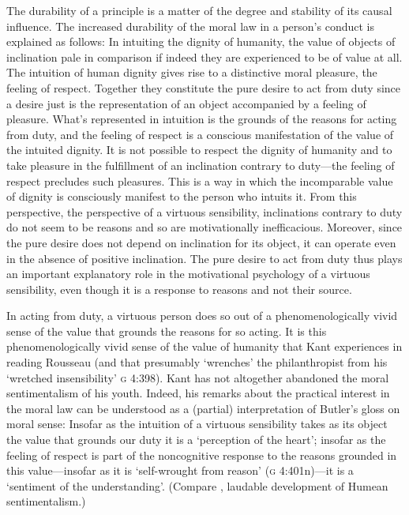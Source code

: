 \documentclass[12pt]{article}
\begin{document}
The durability of a principle is a matter of the degree and stability of its causal influence. The increased durability of the moral law in a person's conduct is explained as follows: In intuiting the dignity of humanity, the value of objects of inclination pale in comparison if indeed they are experienced to be of value at all. The intuition of human dignity gives rise to a distinctive moral pleasure, the feeling of respect. Together they constitute the pure desire to act from duty since a desire just is the representation of an object accompanied by a feeling of pleasure. What's represented in intuition is the grounds of the reasons for acting from duty, and the feeling of respect is a conscious manifestation of the value of the intuited dignity. It is not possible to respect the dignity of humanity and to take pleasure in the fulfillment of an inclination contrary to duty---the feeling of respect precludes such pleasures. This is a way in which the incomparable value of dignity is consciously manifest to the person who intuits it. From this perspective, the perspective of a virtuous sensibility, inclinations contrary to duty do not seem to be reasons and so are motivationally inefficacious. Moreover, since the pure desire does not depend on inclination for its object, it can operate even in the absence of positive inclination. The pure desire to act from duty thus plays an important explanatory role in the motivational psychology of a virtuous sensibility, even though it is a response to reasons and not their source.

In acting from duty, a virtuous person does so out of a phenomenologically vivid sense of the value that grounds the reasons for so acting. It is this phenomenologically vivid sense of the value of humanity that Kant experiences in reading Rousseau (and that presumably `wrenches' the philanthropist from his `wretched insensibility' \textsc{g} 4:398). Kant has not altogether abandoned the moral sentimentalism of his youth. Indeed, his remarks about the practical interest in the moral law can be understood as a (partial) interpretation of Butler's \citeyearpar{Butler:1736id} gloss on moral sense: Insofar as the intuition of a virtuous sensibility takes as its object the value that grounds our duty it is a `perception of the heart'; insofar as the feeling of respect is part of the noncognitive response to the reasons grounded in this value---insofar as it is `self-wrought from reason' (\textsc{g} 4:401n)---it is a `sentiment of the understanding'. (Compare \citealp{Wiggins:1987ta}, laudable development of Humean sentimentalism.)
\end{document}
